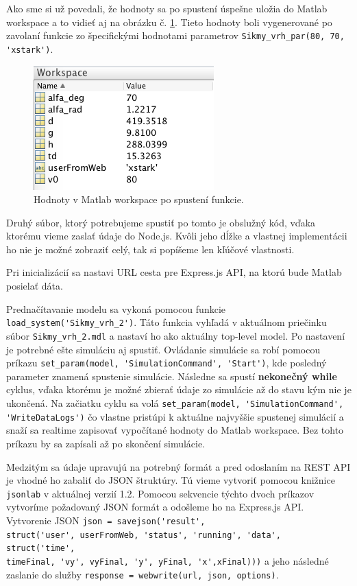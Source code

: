 Ako sme si už povedali, že hodnoty sa po spustení úspešne uložia do Matlab workspace a to vidieť aj na obrázku č. \ref{matlab-function-workspace}. Tieto hodnoty boli vygenerované po zavolaní funkcie zo špecifickými hodnotami parametrov \verb|Sikmy_vrh_par(80, 70, 'xstark')|.

\begin{figure}[H]
  \centering
  \includegraphics[scale=0.7]{img/code/matlab-function-workspace.png}
  \caption{Hodnoty v Matlab workspace po spustení funkcie.}
  \label{matlab-function-workspace}
\end{figure}

Druhý súbor, ktorý potrebujeme spustiť po tomto je obslužný kód, vďaka ktorému vieme zaslať údaje do Node.js. Kvôli jeho dĺžke a vlastnej implementácii ho nie je možné zobraziť celý, tak si popíšeme len kľúčové vlastnosti.

Pri inicializácií sa nastavi URL cesta pre Express.js API, na ktorú bude Matlab posielať dáta.

Prednačítavanie modelu sa vykoná pomocou funkcie \verb|load_system('Sikmy_vrh_2')|. Táto funkcia vyhľadá v aktuálnom priečinku súbor \verb|Sikmy_vrh_2.mdl| a nastaví ho ako aktuálny top-level model. Po nastavení je potrebné ešte simuláciu aj spustiť. Ovládanie simulácie sa robí pomocou príkazu \verb|set_param(model, 'SimulationCommand', 'Start')|, kde posledný parameter znamená spustenie simulácie.
Následne sa spustí \textbf{nekonečný while} cyklus, vďaka ktorému je možné zbierať údaje zo simulácie až do stavu kým nie je ukončená. 
Na začiatku cyklu sa volá \verb|set_param(model, 'SimulationCommand',| \\ \verb|'WriteDataLogs')| čo vlastne pristúpi k aktuálne najvyššie spustenej simulácií a snaží sa realtime zapisovať vypočítané hodnoty do Matlab workspace. Bez tohto príkazu by sa zapísali až po skončení simulácie.

Medzitým sa údaje upravujú na potrebný formát a pred odoslaním na REST API je vhodné ho zabaliť do JSON štruktúry. Tú vieme vytvoriť pomocou knižnice \verb|jsonlab| v aktuálnej verzií 1.2.
Pomocou sekvencie týchto dvoch príkazov vytvoríme požadovaný JSON formát a odošleme ho na Express.js API. Vytvorenie JSON \verb|json = savejson('result',| \\ \verb|struct('user', userFromWeb, 'status', 'running', 'data', struct('time',| \\ \verb|timeFinal, 'vy', vyFinal, 'y', yFinal, 'x',xFinal)))| a jeho následné zaslanie do služby \verb|response = webwrite(url, json, options)|.


